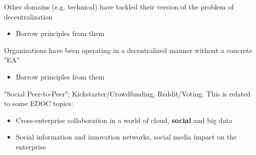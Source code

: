     Other domains (e.g. technical) have tackled their version of the problem of decentralization
    \begin{itemize}
    \item Borrow principles from them
    \end{itemize}
    
    Organizations have been operating in a decentralized manner without a concrete "EA"
    \begin{itemize}
    \item Borrow principles from them
    \end{itemize}
    
    "Social Peer-to-Peer"; Kickstarter/Crowdfunding, Reddit/Voting. This is related to some EDOC topics:
    \begin{itemize}
    \item Cross-enterprise collaboration in a world of cloud, \textbf{social} and big data
    \item Social information and innovation networks, social media impact on the enterprise
    \end{itemize}

    
